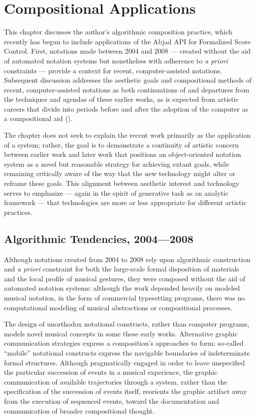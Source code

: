 \chapter{Compositional Applications}

This chapter discusses the author's algorithmic composition practice, which recently has begun to include applications of the Abjad API for Formalized Score Control. First, notations made between 2004 and 2008 --- created without the aid of automated notation systems but nonetheless with adherence to \emph{a priori} constraints --- provide a context for recent, computer-assisted notations. Subsequent discussion addresses the aesthetic goals and compositional methods of recent, computer-assisted notations as both continuations of and departures from the techniques and agendas of these earlier works, as is expected from artistic careers that divide into periods before and after the adoption of the computer as a compositional aid (\cite{rosen2011little}).

The chapter does not seek to explain the recent work primarily as the application of a system; rather, the goal is to demonstrate a continuity of artistic concern between earlier work and later work that positions an object-oriented notation system as a novel but reasonable strategy for achieving extant goals, while remaining critically aware of the way that the new technology might alter or reframe these goals. This alignment between aesthetic interest and technology serves to emphasize --- again in the spirit of generative task as an analytic framework --- that technologies are more or less appropriate for different artistic practices.
 
\section{Algorithmic Tendencies, 2004---2008}

Although notations created from 2004 to 2008 rely upon algorithmic construction and \emph{a priori} constraint for both the large-scale formal disposition of materials and the local profile of musical gestures, they were composed without the aid of automated notation systems: although the work depended heavily on modeled musical notation, in the form of commercial typesetting programs, there was no computational modeling of musical abstractions or compositional processes. 

The design of unorthodox notational constructs, rather than computer programs, models novel musical concepts in some these early works. Alternative graphic communication strategies express a composition's approaches to form: so-called ``mobile'' notational constructs express the navigable boundaries of indeterminate formal structures. Although pragmatically engaged in order to leave unspecified the particular succession of events in a musical experience, the graphic communication of available trajectories through a system, rather than the specification of the succession of events itself, reorients the graphic artifact away from the execution of sequenced events, toward the documentation and communication of broader compositional thought. 

